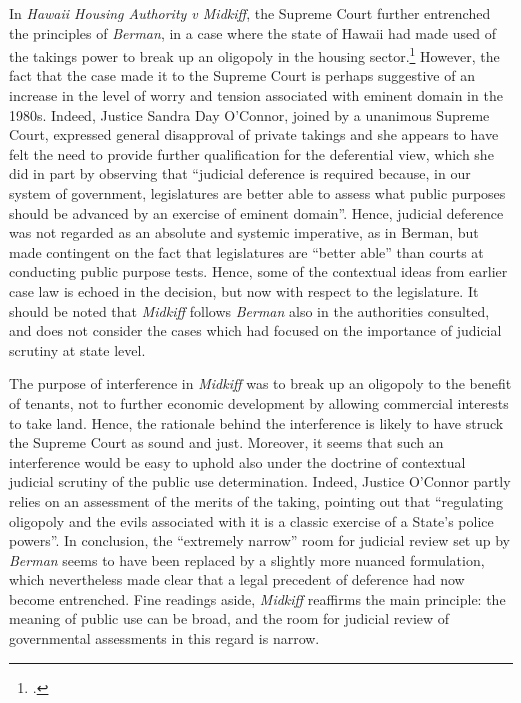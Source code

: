 \documentclass[12pt,a4paper]{book} %
\begin{document}
In {\it Hawaii Housing Authority v Midkiff}, the Supreme Court further entrenched the principles of {\it Berman}, in a case where the state of Hawaii had made used of the takings power to break up an oligopoly in the housing sector.\footcite{midkiff84}  However, the fact that the case made it to the Supreme Court is perhaps suggestive of an increase in the level of worry and tension associated with eminent domain in the 1980s. Indeed, Justice Sandra Day O'Connor, joined by a unanimous Supreme Court, expressed general disapproval of private takings and she appears to have felt the need to provide further qualification for the deferential view, which she did in part by observing that ``judicial deference is required because, in our system of government, legislatures are better able to assess what public purposes should be advanced by an exercise of eminent domain''. Hence, judicial deference was not regarded as an absolute and systemic imperative, as in Berman, but made contingent on the fact that legislatures are ``better able'' than courts at conducting public purpose tests. Hence, some of the contextual ideas from earlier case law is echoed in the decision, but now with respect to the legislature. It should be noted that {\it Midkiff} follows {\it Berman} also in the authorities consulted, and does not consider the cases which had focused on the importance of judicial scrutiny at state level.

The purpose of interference in {\it Midkiff} was to break up an oligopoly to the benefit of tenants, not to further economic development by allowing commercial interests to take land. Hence, the rationale behind the interference is likely to have struck the Supreme Court as sound and just. Moreover, it seems that such an interference would be easy to uphold also under the doctrine of contextual judicial scrutiny of the public use determination. Indeed, Justice O'Connor partly relies on an assessment of the merits of the taking, pointing out that  ``regulating oligopoly and the evils associated with it is a classic exercise of a State's police powers''. In conclusion, the ``extremely narrow'' room for judicial review set up by {\it Berman} seems to have been replaced by a slightly more nuanced formulation, which nevertheless made clear that a legal precedent of deference had now become entrenched. Fine readings aside, {\it Midkiff} reaffirms the main principle:  the meaning of public use can be broad, and the room for judicial review of governmental assessments in this regard is narrow.
\end{document}
